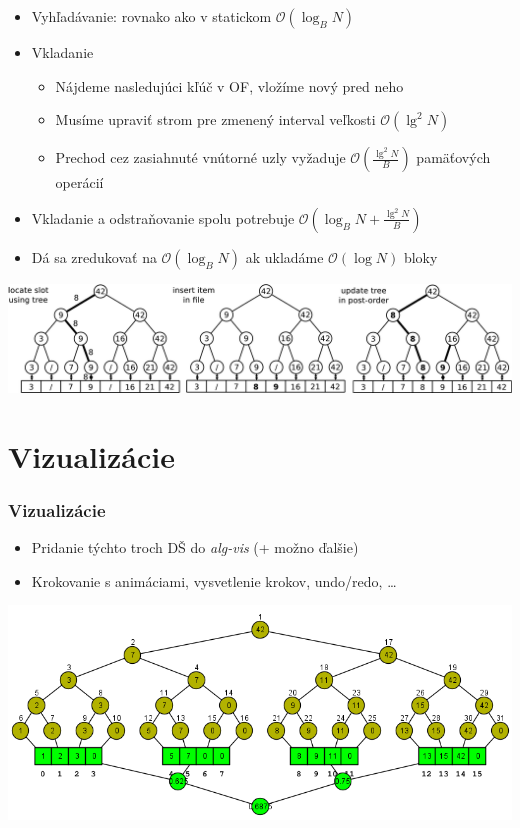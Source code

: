 \documentclass{beamer}
\newcommand{\bigO}{\ensuremath{\mathcal{O}}}
\begin{document}
\begin{frame}
    \begin{itemize}
        \item Vyhľadávanie: rovnako ako v statickom $\bigO(\log_B N)$
        \item Vkladanie
        \begin{itemize}
            \item Nájdeme nasledujúci kľúč v OF, vložíme nový pred neho
            \item Musíme upraviť strom pre zmenený interval veľkosti $\bigO(\lg^2 N)$
            \item Prechod cez zasiahnuté vnútorné uzly vyžaduje $\bigO(\frac{\lg^2 N}{B})$ pamäťových operácií
        \end{itemize}
        \item Vkladanie a odstraňovanie spolu potrebuje $\bigO(\log_B N + \frac{\lg^2 N}{B})$
        \item Dá sa zredukovať na $\bigO(\log_B N)$ ak ukladáme $\bigO(\log N)$ bloky
    \end{itemize}
    \begin{center}
        \includegraphics[width=\textwidth]{../figures/downloaded_dont_use/dyn-insert.pdf}
    \end{center}
\end{frame}

\section{Vizualizácie}
\begin{frame}
    \frametitle{Vizualizácie}
    \begin{itemize}
        \item Pridanie týchto troch DŠ do {\em alg-vis} (+ možno ďalšie)
        \item Krokovanie s animáciami, vysvetlenie krokov, undo/redo, \dots
    \end{itemize}
    \begin{center}
        \includegraphics[width=\textwidth]{../figures/screenshots/slides_cobtree.png}
    \end{center}
\end{frame}
\end{document}
